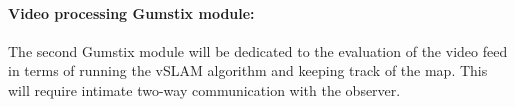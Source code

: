         \paragraph{Video processing Gumstix\textsuperscript{\textregistered} module: }
        The second Gumstix\textsuperscript{\textregistered} module will be dedicated
        to the evaluation of the video feed in terms of running the vSLAM
        algorithm and keeping track of the map.
        This will require intimate two-way communication with the observer.
